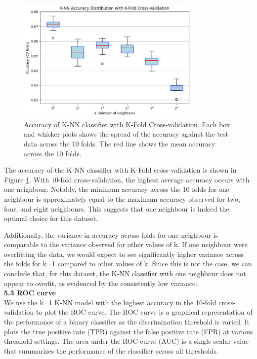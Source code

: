 \documentclass[12pt]{article}
\begin{document}
\begin{figure}[H]
\centering
\includegraphics[width=0.8\textwidth]{figures/knn_accuracy_kfold.png}
\caption{Accuracy of K-NN classifier with K-Fold Cross-validation. Each box and whisker plots shows the spread of the accuracy against the test data across the 10 folds. The red line shows the mean accuracy across the 10 folds.}
\label{fig:knn_accuracy_kfold}
\end{figure}

The accuracy of the K-NN classifier with K-Fold cross-validation is shown in Figure \ref{fig:knn_accuracy_kfold}. With 10-fold cross-validation, the highest average accuracy occurs with one neighbour. Notably, the minimum accuracy across the 10 folds for one neighbour is approximately equal to the maximum accuracy observed for two, four, and eight neighbours. This suggests that one neighbour is indeed the optimal choice for this dataset.

Additionally, the variance in accuracy across folds for one neighbour is comparable to the variance observed for other values of k. If one neighbour were overfitting the data, we would expect to see significantly higher variance across the folds for k=1 compared to other values of k. Since this is not the case, we can conclude that, for this dataset, the K-NN classifier with one neighbour does not appear to overfit, as evidenced by the consistently low variance.
\\

\textbf{5.3 ROC curve}
\\
We use the k=1 K-NN model with the highest accuracy in the 10-fold cross-validation to plot the ROC curve. The ROC curve is a graphical representation of the performance of a binary classifier as the discrimination threshold is varied. It plots the true positive rate (TPR) against the false positive rate (FPR) at various threshold settings. The area under the ROC curve (AUC) is a single scalar value that summarizes the performance of the classifier across all thresholds.
\end{document}
